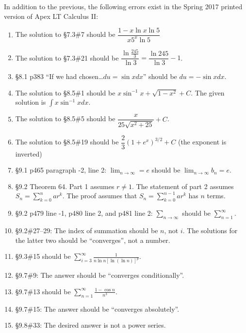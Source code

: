 \documentclass{amsart}
\newcommand{\ds}{\displaystyle}
\begin{document}
\clearpage

\springerrors

In addition to the previous, the following errors exist in the Spring 2017 printed version of Apex LT Calculus II:
\begin{enumerate}
\item The solution to \S7.3\#7 should be $\dfrac{1-x\ln x\ln5}{x5^x\ln5}$\smallskip
\item The solution to \S7.3\#21 should be $\dfrac{\ln\frac{245}3}{\ln3}=\dfrac{\ln245}{\ln3}-1$.
\item \S8.1 p383 ``If we had chosen\ldots $du=\sin x dx$'' should be $du=-\sin x dx$.
\item The solution to \S8.5\#1 should be $x\sin^{-1}x+\sqrt{1-x^2}+C$.  The given solution is $\ds\int x\sin^{-1}x dx$.\vspace{-.3\baselineskip}
\item The solution to \S8.5\#5 should be $\dfrac x{25\sqrt{x^2+25}}+C$.
\item The solution to \S8.5\#19 should be $\dfrac23 (1+e^x)^{3/2}+C$ (the exponent is inverted)
\item \S9.1 p465 paragraph -2, line 2: $\ds \lim_{n\to \infty}=e$ should be $\ds \lim_{n\to \infty}b_n=e$.
\vspace{-.5\baselineskip}
\item \S9.2 Theorem 64.  Part 1 assumes $r\neq1$.  The statement of part 2 assumes $S_n=\ds\sum_{k=0}^n ar^k$.\vspace{-\baselineskip} The proof assumes that $S_n=\ds\sum_{k=0}^{n-1} ar^k$ has $n$ terms.\vspace{-.7\baselineskip}
\item \S9.2 p479 line -1, p480 line 2, and p481 line 2: $\ds\sum_{n\to\infty}$ should be $\ds\sum_{n=1}^\infty$.
\item \S9.2\#27--29: The index of summation should be $n$, not $i$.  The solutions for the latter two should be ``converges'', not a number.\vspace{-.3\baselineskip}
\item \S9.3\#15 should be $\ds\sum_{i=3}^\infty\frac1{n\ln n[\ln(\ln n)]^p}$.
\item \S9.7\#9: The answer should be ``converges conditionally''.
\item \S9.7\#13 should be $\ds \sum_{n=1}^\infty \frac{1-\cos n}{n^3}$.
\item \S9.7\#15: The answer should be ``converges absolutely''.
\item \S9.8\#33: The desired answer is not a power series.

\end{enumerate}
\end{document}
